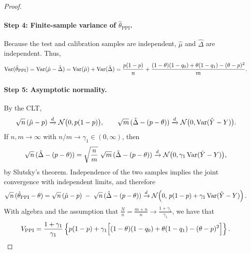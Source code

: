 \begin{proof}
\paragraph{Step 4: Finite-sample variance of $\hat\theta_{\mathrm{PPI}}$.}
Because the test and calibration samples are independent, $\hat\mu$ and $\hat\Delta$ are independent.
Thus,
\[
\mathrm{Var}(\hat\theta_{\mathrm{PPI}})
=\mathrm{Var}(\hat\mu-\hat\Delta)
=\mathrm{Var}(\hat\mu)+\mathrm{Var}(\hat\Delta)
=
\frac{p(1-p)}{n}
+
\frac{(1-\theta)(1-q_0)+\theta(1-q_1)-(\theta-p)^2}{m}.
\]


\paragraph{Step 5: Asymptotic normality.}
By the CLT,
\[
\sqrt{n}\,(\hat\mu-p)\xrightarrow{d}\mathcal N\bigl(0,p(1-p)\bigr),
\qquad
\sqrt{m}\,(\hat\Delta-(p-\theta))\xrightarrow{d}\mathcal N\bigl(0,\mathrm{Var}(\hat Y-Y)\bigr).
\]
If $n,m\to\infty$ with $n/m\to\gamma_1\in(0,\infty)$, then
\[
\sqrt{n}\,(\hat\Delta-(p-\theta))
=
\sqrt{\frac{n}{m}}\ \sqrt{m}\,(\hat\Delta-(p-\theta))
\xrightarrow{d}\mathcal N\bigl(0,\gamma_1\,\mathrm{Var}(\hat Y-Y)\bigr),
\]
by Slutsky's theorem. Independence of the two samples implies the joint convergence with independent
limits, and therefore
\[
\sqrt{n}\,(\hat\theta_{\mathrm{PPI}}-\theta)
=
\sqrt{n}\,(\hat\mu-p)\;-\;\sqrt{n}\,(\hat\Delta-(p-\theta))
\xrightarrow{d}
\mathcal N\!\left(
0,\,
p(1-p)+\gamma_1\,\mathrm{Var}(\hat Y-Y)
\right).
\]
With algebra and the assumption that $\frac{N}{n}= \frac{m+n}{n}\to \frac{1+\gamma_1}{\gamma_1}$, we have that 
\[
V_{\mathrm{PPI}}
=
\frac{1+\gamma_1}{\gamma_1} \left\{p(1-p)
+
\gamma_1\Bigl[(1-\theta)(1-q_0)+\theta(1-q_1)-(\theta-p)^2\Bigr]\right\}.
\]
\end{proof}


